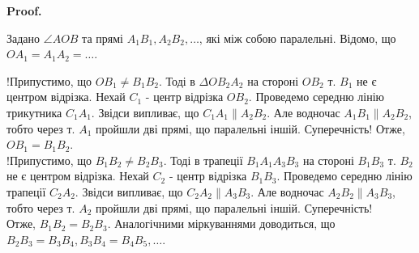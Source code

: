 \documentclass[a4paper, 10pt]{article}
\makeatletter
\def\qed{$\blacksquare$}
\theoremstyle{theoremdd}
\theoremstyle{theoremdd}
\theoremstyle{theoremdd}
\theoremstyle{theoremdd}
\theoremstyle{theoremdd}
\theoremstyle{theoremdd}
\theoremstyle{theoremdd}
\theoremstyle{theoremdd}
\theoremstyle{theoremdd}
\renewenvironment{proof}[1][Proof.\\]{\par
\pushQED{\hfill \qed}%
\normalfont \topsep6\p@\@plus6\p@\relax
\trivlist
\item\relax
{\bfseries
#1\@addpunct{.}}\hspace\labelsep\ignorespaces
}{%
\popQED\endtrivlist\@endpefalse
}
\makeatother
\begin{document}
\begin{proof}
Задано $\angle AOB$ та прямі $A_1B_1,A_2B_2,\dots$, які між собою паралельні. Відомо, що \\ $OA_1 = A_1A_2 = \dots$.
\begin{figure}[H]
\centering
{}
\end{figure}
!Припустимо, що $OB_1 \neq B_1B_2$. Тоді в $\Delta OB_2A_2$ на стороні $OB_2$ т. $B_1$ не є центром відрізка. Нехай $C_1$ - центр відрізка $OB_2$. Проведемо середню лінію трикутника $C_1A_1$. Звідси випливає, що $C_1A_1 \parallel A_2B_2$. Але водночас $A_1B_1 \parallel A_2B_2$, тобто через т. $A_1$ пройшли дві прямі, що паралельні іншій. Суперечність!
Отже, $OB_1 = B_1B_2$.
\bigskip \\
!Припустимо, що $B_1B_2 \neq B_2B_3$. Тоді в трапеції $B_1A_1A_3B_3$ на стороні $B_1B_3$ т. $B_2$ не є центром відрізка. Нехай $C_2$ - центр відрізка $B_1B_3$. Проведемо середню лінію трапеції $C_2A_2$. Звідси випливає, що $C_2A_2 \parallel A_3B_3$. Але водночас $A_2B_2 \parallel A_3B_3$, тобто через т. $A_2$ пройшли дві прямі, що паралельні іншій. Суперечність!\\
Отже, $B_1B_2 = B_2B_3$. Аналогічними міркуваннями доводиться, що $B_2B_3 = B_3B_4, B_3B_4 = B_4B_5,\dots$.
\end{proof}
\end{document}
